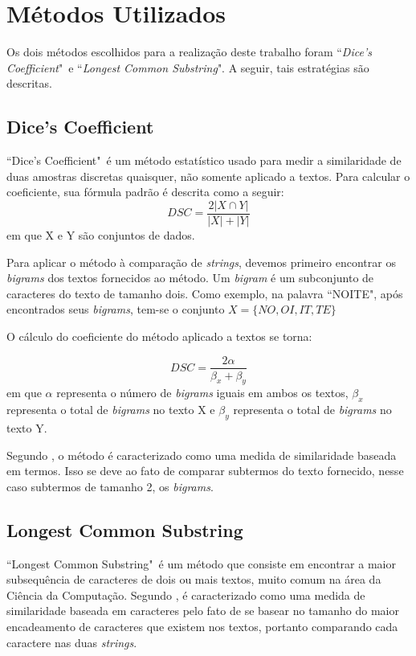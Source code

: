 \documentclass[12pt]{article}
\begin{document}
\section{Métodos Utilizados}

Os dois métodos escolhidos para a realização deste trabalho foram ``\textit{Dice's Coefficient}"\ e ``\textit{Longest Common Substring}". A seguir, tais estratégias são descritas.

\subsection{Dice's Coefficient}

``Dice's Coefficient"\ é um método estatístico usado para medir a similaridade de duas amostras discretas quaisquer, não somente aplicado a textos. Para calcular o coeficiente, sua fórmula padrão é descrita como a seguir: 
\begin{equation}
DSC={\frac {2|X\cap Y|}{|X|+|Y|}}
\end{equation}
em que X e Y são conjuntos de dados.

Para aplicar o método à comparação de \textit{strings}, devemos primeiro encontrar os \textit{bigrams} dos textos fornecidos ao método. Um \textit{bigram} é um subconjunto de caracteres do texto de tamanho dois. Como exemplo, na palavra ``NOITE", após encontrados seus \textit{bigrams}, tem-se o conjunto $X=\{NO, OI, IT, TE\}$

O cálculo do coeficiente do método aplicado a textos se torna:

\begin{equation}
    DSC={\frac{2\alpha}{\beta_x + \beta_y}}
\end{equation}
em que $\alpha$ representa o número de \textit{bigrams} iguais em ambos os textos, $\beta_x$ representa o total de \textit{bigrams} no texto X e $\beta_y$ representa o total de \textit{bigrams} no texto Y. 

Segundo \cite{gomaa2013survey}, o método é caracterizado como uma medida de similaridade baseada em termos. Isso se deve ao fato de comparar subtermos do texto fornecido, nesse caso subtermos de tamanho 2, os \textit{bigrams}.

\subsection{Longest Common Substring}

``Longest Common Substring"\ é um método que consiste em encontrar a maior subsequência de caracteres de dois ou mais textos, muito comum na área da Ciência da Computação. Segundo \cite{gomaa2013survey}, é caracterizado como uma medida de similaridade baseada em caracteres pelo fato de se basear no tamanho do maior encadeamento de caracteres que existem nos textos, portanto comparando cada caractere nas duas \textit{strings}.
\end{document}
